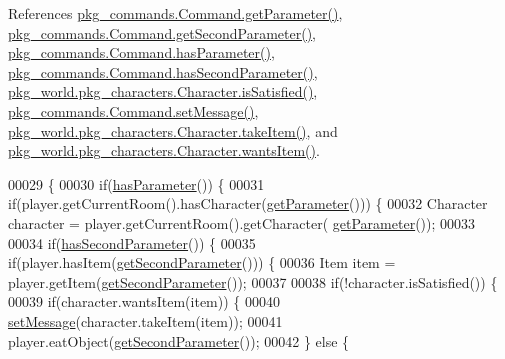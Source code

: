 References \hyperlink{Command_8java_source_l00041}{pkg\-\_\-commands.\-Command.\-get\-Parameter()}, \hyperlink{Command_8java_source_l00049}{pkg\-\_\-commands.\-Command.\-get\-Second\-Parameter()}, \hyperlink{Command_8java_source_l00073}{pkg\-\_\-commands.\-Command.\-has\-Parameter()}, \hyperlink{Command_8java_source_l00081}{pkg\-\_\-commands.\-Command.\-has\-Second\-Parameter()}, \hyperlink{Character_8java_source_l00131}{pkg\-\_\-world.\-pkg\-\_\-characters.\-Character.\-is\-Satisfied()}, \hyperlink{Command_8java_source_l00089}{pkg\-\_\-commands.\-Command.\-set\-Message()}, \hyperlink{Character_8java_source_l00108}{pkg\-\_\-world.\-pkg\-\_\-characters.\-Character.\-take\-Item()}, and \hyperlink{Character_8java_source_l00119}{pkg\-\_\-world.\-pkg\-\_\-characters.\-Character.\-wants\-Item()}.


\begin{DoxyCode}
00029                                                                                                            
                              \{
00030         \textcolor{keywordflow}{if}(\hyperlink{classpkg__commands_1_1Command_a02af95ab3f1898a66259ab7c177b6998}{hasParameter}()) \{
00031             \textcolor{keywordflow}{if}(player.getCurrentRoom().hasCharacter(\hyperlink{classpkg__commands_1_1Command_a41c92d445be73ea9d62320c65efb8434}{getParameter}())) \{
00032                 Character character = player.getCurrentRoom().getCharacter(
      \hyperlink{classpkg__commands_1_1Command_a41c92d445be73ea9d62320c65efb8434}{getParameter}());
00033 
00034                 \textcolor{keywordflow}{if}(\hyperlink{classpkg__commands_1_1Command_add688a76d80576c34f23927da19b9e2d}{hasSecondParameter}()) \{
00035                     \textcolor{keywordflow}{if}(player.hasItem(\hyperlink{classpkg__commands_1_1Command_a20d3ebdc0683a87b43be2a92a1cad111}{getSecondParameter}())) \{
00036                         Item item = player.getItem(\hyperlink{classpkg__commands_1_1Command_a20d3ebdc0683a87b43be2a92a1cad111}{getSecondParameter}());
00037 
00038                         \textcolor{keywordflow}{if}(!character.isSatisfied()) \{
00039                             \textcolor{keywordflow}{if}(character.wantsItem(item)) \{
00040                                 \hyperlink{classpkg__commands_1_1Command_ae210ff216fe908b111ba1c988a963d13}{setMessage}(character.takeItem(item));
00041                                 player.eatObject(\hyperlink{classpkg__commands_1_1Command_a20d3ebdc0683a87b43be2a92a1cad111}{getSecondParameter}());
00042                             \} \textcolor{keywordflow}{else} \{

\end{DoxyCode}
